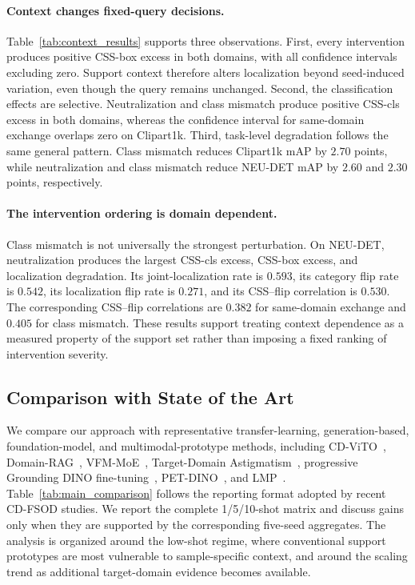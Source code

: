 \paragraph{Context changes fixed-query decisions.}
Table~\ref{tab:context_results} supports three observations. First, every intervention produces positive CSS-box excess in both domains, with all confidence intervals excluding zero. Support context therefore alters localization beyond seed-induced variation, even though the query remains unchanged. Second, the classification effects are selective. Neutralization and class mismatch produce positive CSS-cls excess in both domains, whereas the confidence interval for same-domain exchange overlaps zero on Clipart1k. Third, task-level degradation follows the same general pattern. Class mismatch reduces Clipart1k mAP by $2.70$ points, while neutralization and class mismatch reduce NEU-DET mAP by $2.60$ and $2.30$ points, respectively.

\paragraph{The intervention ordering is domain dependent.}
Class mismatch is not universally the strongest perturbation. On NEU-DET, neutralization produces the largest CSS-cls excess, CSS-box excess, and localization degradation. Its joint-localization rate is $0.593$, its category flip rate is $0.542$, its localization flip rate is $0.271$, and its CSS--flip correlation is $0.530$. The corresponding CSS--flip correlations are $0.382$ for same-domain exchange and $0.405$ for class mismatch. These results support treating context dependence as a measured property of the support set rather than imposing a fixed ranking of intervention severity.

\subsection{Comparison with State of the Art}
\label{sec:main_results}

We compare our approach with representative transfer-learning, generation-based, foundation-model, and multimodal-prototype methods, including CD-ViTO~\cite{cdvito}, Domain-RAG~\cite{domainrag}, VFM-MoE~\cite{vfmmoe}, Target-Domain Astigmatism~\cite{astigmatism}, progressive Grounding DINO fine-tuning~\cite{yu2026}, PET-DINO~\cite{petdino}, and LMP~\cite{lmp}. Table~\ref{tab:main_comparison} follows the reporting format adopted by recent CD-FSOD studies. We report the complete 1/5/10-shot matrix and discuss gains only when they are supported by the corresponding five-seed aggregates. The analysis is organized around the low-shot regime, where conventional support prototypes are most vulnerable to sample-specific context, and around the scaling trend as additional target-domain evidence becomes available.

